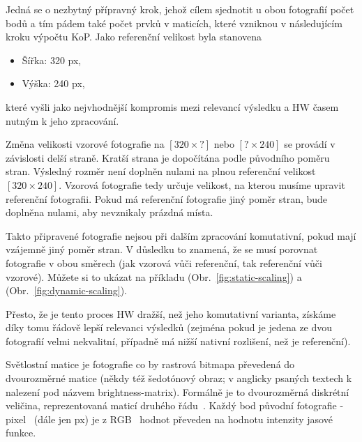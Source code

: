 Jedná se o nezbytný přípravný krok, jehož cílem sjednotit u obou fotografií počet bodů a tím pádem také počet prvků v maticích, které vzniknou v následujícím kroku výpočtu KoP.
Jako referenční velikost byla stanovena
\begin{itemize}
	\setlength{\parskip}{0pt}
	\setlength{\itemsep}{0pt}
	\item Šířka: 320 px,
	\item Výška: 240 px,
\end{itemize}
které vyšli jako nejvhodnější kompromis mezi relevancí výsledku a HW časem nutným k jeho zpracování.

Změna velikosti vzorové fotografie na $ [320 × ?] $ nebo $ [? × 240] $ se provádí v závislosti delší straně. Kratší strana je dopočítána podle původního poměru stran. Výsledný rozměr není doplněn nulami na plnou referenční velikost $ [320 × 240] $. Vzorová fotografie tedy určuje velikost, na kterou musíme upravit referenční fotografii. Pokud má referenční fotografie jiný poměr stran, bude doplněna nulami, aby nevznikaly prázdná místa.

Takto připravené fotografie nejsou při dalším zpracování komutativní, pokud mají vzájemně jiný poměr stran. V důsledku to znamená, že se musí porovnat fotografie v obou směrech (jak vzorová vůči referenční, tak referenční vůči vzorové). Můžete si to ukázat na příkladu (Obr.~\ref{fig:static-scaling}) a (Obr.~\ref{fig:dynamic-scaling}).



Přesto, že je tento proces HW dražší, než jeho komutativní varianta, získáme díky tomu řádově lepší relevanci výsledků (zejména pokud je jedena ze dvou fotografií velmi nekvalitní, případně má nižší nativní rozlišení, než je referenční).

Světlostní matice je fotografie co by rastrová bitmapa převedená do dvourozměrné matice (někdy též šedotónový obraz; v anglicky psaných textech k nalezení pod názvem brightness-matrix). Formálně je to dvourozměrná diskrétní veličina, reprezentovaná maticí druhého řádu~\cite{brightness-matrix}. Každý bod původní fotografie - pixel~\cite{pixel} (dále jen px) je z RGB~\cite{rgb} hodnot převeden na hodnotu intenzity jasové funkce.

